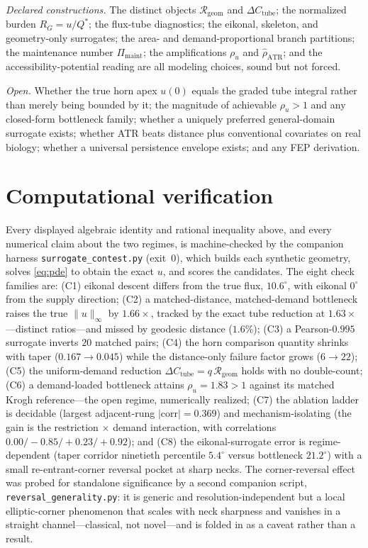 \documentclass[11pt]{article}
\theoremstyle{remark}
\newcommand{\Rgeom}{\mathcal{R}_{\mathrm{geom}}}
\newcommand{\dCtube}{\Delta C_{\mathrm{tube}}}
\newcommand{\rhou}{\rho_u}
\newcommand{\rhohat}{\hat\rho_{\mathrm{ATR}}}
\newcommand{\Pimaint}{\Pi_{\mathrm{maint}}}
\newcommand{\RG}{R_{G}}
\newcommand{\Qstar}{Q^{\!*}}
\newcommand{\norminf}[1]{\lVert#1\rVert_{\infty}}
\begin{document}
\emph{Declared constructions.} The distinct objects $\Rgeom$ and $\dCtube$; the
normalized burden $\RG=u/\Qstar$; the flux-tube diagnostics; the eikonal,
skeleton, and geometry-only surrogates; the area- and demand-proportional branch
partitions; the maintenance number $\Pimaint$; the amplifications $\rhou$ and
$\rhohat$; and the accessibility-potential reading are all modeling choices, sound
but not forced.

\emph{Open.} Whether the true horn apex $u(0)$ equals the graded tube integral
rather than merely being bounded by it; the magnitude of achievable $\rhou>1$ and
any closed-form bottleneck family; whether a uniquely preferred general-domain
surrogate exists; whether ATR beats distance plus conventional covariates on real
biology; whether a universal persistence envelope exists; and any FEP derivation.

\section{Computational verification}\label{sec:verify}

Every displayed algebraic identity and rational inequality above, and every
numerical claim about the two regimes, is machine-checked by the companion
harness \texttt{surrogate\_contest.py} (exit~$0$), which builds each synthetic
geometry, solves \eqref{eq:pde} to obtain the exact $u$, and scores the
candidates. The eight check families are: (C1) eikonal descent differs from the
true flux, $10.6^\circ$, with eikonal $0^\circ$ from the supply direction; (C2) a
matched-distance, matched-demand bottleneck raises the true $\norminf{u}$ by
$1.66\times$, tracked by the exact tube reduction at $1.63\times$---distinct
ratios---and missed by geodesic distance ($1.6\%$); (C3) a Pearson-$0.995$
surrogate inverts $20$ matched pairs; (C4) the horn comparison quantity shrinks
with taper ($0.167\to0.045$) while the distance-only failure factor grows
($6\to22$); (C5) the uniform-demand reduction $\dCtube=q\,\Rgeom$ holds with no
double-count; (C6) a demand-loaded bottleneck attains $\rhou=1.83>1$ against its
matched Krogh reference---the open regime, numerically realized; (C7) the ablation
ladder is decidable (largest adjacent-rung $\lvert\text{corr}\rvert=0.369$) and
mechanism-isolating (the gain is the restriction$\,\times\,$demand interaction,
with correlations $0.00/-0.85/+0.23/+0.92$); and (C8) the eikonal-surrogate error
is regime-dependent (taper corridor ninetieth percentile $5.4^\circ$ versus
bottleneck $21.2^\circ$) with a small re-entrant-corner reversal pocket at sharp
necks. The corner-reversal effect was probed for standalone significance by a
second companion script, \texttt{reversal\_generality.py}: it is generic and
resolution-independent but a local elliptic-corner phenomenon that scales with
neck sharpness and vanishes in a straight channel---classical, not novel---and is
folded in as a caveat rather than a result.
\end{document}
